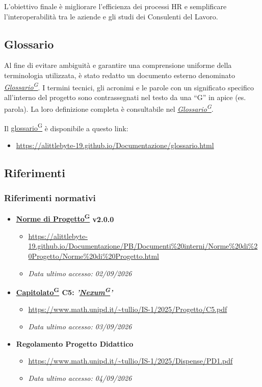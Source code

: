 \documentclass[a4paper,12pt]{article}
\providecommand{\glslink}[2]{\href{https://alittlebyte-19.github.io/Documentazione/glossario.html\#gls-#1}{\underline{#2}\textsuperscript{\scriptsize G}}}
\begin{document}
L'obiettivo finale è migliorare l'efficienza dei processi HR e semplificare l'interoperabilità tra le aziende e gli studi dei Consulenti del Lavoro.

\subsection{Glossario}
\label{sec:glossario}
Al fine di evitare ambiguità e garantire una comprensione uniforme della terminologia utilizzata, è stato redatto un documento esterno denominato \textit{\glslink{glossario}{Glossario}}.
I termini tecnici, gli acronimi e le parole con un significato specifico all'interno del progetto sono contrassegnati nel testo da una ``G'' in apice (es. parola\textsuperscript{}). La loro definizione completa è consultabile nel \textit{\glslink{glossario}{Glossario}}.


Il \glslink{glossario}{glossario} è disponibile a questo link:
\begin{itemize}
    \item \url{https://alittlebyte-19.github.io/Documentazione/glossario.html}
\end{itemize}

\subsection{Riferimenti}
\label{sec:riferimenti}
\subsubsection{Riferimenti normativi}
\begin{itemize}
    \item \textbf{\glslink{norme-di-progetto}{Norme di Progetto} v2.0.0}
    \begin{itemize}
        \item \url{https://alittlebyte-19.github.io/Documentazione/PB/Documenti%20interni/Norme%20di%20Progetto/Norme%20di%20Progetto.html}
        \item \textit{Data ultimo accesso: 02/09/2026} 
    \end{itemize}
    \item \textbf{\glslink{capitolato}{Capitolato} C5: \textit{\textbf{'\glslink{nexum}{Nexum}'}}}
    \begin{itemize}
        \item \url{https://www.math.unipd.it/~tullio/IS-1/2025/Progetto/C5.pdf}
        \item \textit{Data ultimo accesso: 03/09/2026}
    \end{itemize}
     \item \textbf{Regolamento Progetto Didattico}
    \begin{itemize}
        \item \url{https://www.math.unipd.it/~tullio/IS-1/2025/Dispense/PD1.pdf}
        \item \textit{Data ultimo accesso: 04/09/2026}
    \end{itemize}
   
\end{itemize}
\end{document}
